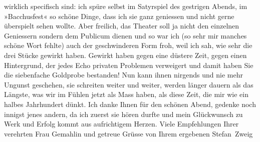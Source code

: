                wirklich specifisch sind: ich spüre selbst im Satyrspiel des gestrigen Abends, im
                  »Bacchusfest« so schöne Dinge, dass ich sie
               ganz geniessen und nicht gerne überspielt sehen wollte. Aber freilich, das Theater
               soll ja nicht den einzelnen Geniessern sondern dem Publicum dienen und so war ich (so
               sehr mir manches schöne Wort fehlte) auch der geschwinderen Form froh, weil ich sah,
               wie sehr die drei Stücke gewirkt haben. Gewirkt
               haben gegen eine düstere Zeit, gegen einen Hintergrund, der jedes Echo privaten
               Problemen verweigert und damit \introOben{}haben Sie\introOben{} die siebenfache Goldprobe {\pb}bestanden! Nun kann ihnen nirgends und
               nie mehr Ungunst geschehen, sie schreiten weiter und weiter, werden länger dauern als
               das Längste, was wir im Fühlen jetzt als Mass haben, als diese Zeit, die mir wie ein
               halbes Jahrhundert dünkt. Ich danke Ihnen für den schönen Abend, gedenke noch innigst
               jenes andern, da ich zuerst sie hören durfte und mein Glückwunsch zu Werk und Erfolg
               kommt aus aufrichtigem Herzen. Viele Empfehlungen Ihrer verehrten Frau Gemahlin und getreue Grüsse
               von Ihrem ergebenen\pend
           \pstart \spacefill\mbox{Stefan Zweig}\pend{}\endnumbering{}  \newcommand{\dateiname}{L03655}\newcommand{\titel}{Stefan Zweig an Arthur Schnitzler, 13. 10. 1915}\newcommand{\editorInnen}{Selma Jahnke und Martin Anton Müller}
